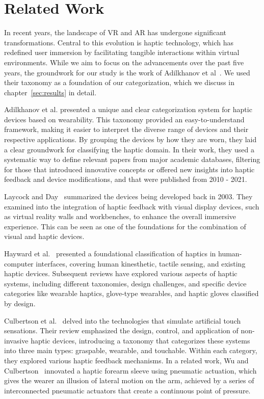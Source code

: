 \section{Related Work}
\label{sec:rel_work}

In recent years, the landscape of VR and AR has undergone significant transformations. Central to this evolution is haptic technology, which has redefined user immersion by facilitating tangible interactions within virtual environments. While we aim to focus on the advancements over the past five years, the groundwork for our study is the work of Adilkhanov et al~\cite{Adilkhanov22}. We used their taxonomy as a foundation of our categorization, which we discuss in chapter~\ref{sec:results} in detail.

Adilkhanov et al. presented a unique and clear categorization system for haptic devices based on wearability. This taxonomy provided an easy-to-understand framework, making it easier to interpret the diverse range of devices and their respective applications. By grouping the devices by how they are worn, they laid a clear groundwork for classifying the haptic domain. In their work, they used a systematic way to define relevant papers from major academic databases, filtering for those that introduced innovative concepts or offered new insights into haptic feedback and device modifications, and that were published from 2010 - 2021. 

Laycock and Day~\cite{Laycock03} summarized the devices being developed back in 2003. They examined into the integration of haptic feedback with visual display devices, such as virtual reality walls and workbenches, to enhance the overall immersive experience. This can be seen as one of the foundations for the combination of visual and haptic devices.

Hayward et al.~\cite{Hayward04c} presented a foundational classification of haptics in human-computer interfaces, covering human kinesthetic, tactile sensing, and existing haptic devices. Subsequent reviews have explored various aspects of haptic systems, including different taxonomies, design challenges, and specific device categories like wearable haptics, glove-type wearables, and haptic gloves classified by design.

Culbertson et al.~\cite{Culbertson18} delved into the technologies that simulate artificial touch sensations. Their review emphasized the design, control, and application of non-invasive haptic devices, introducing a taxonomy that categorizes these systems into three main types: graspable, wearable, and touchable. Within each category, they explored various haptic feedback mechanisms. In a related work, Wu and Culbertson~\cite{WuC19} innovated a haptic forearm sleeve using pneumatic actuation, which gives the wearer an illusion of lateral motion on the arm, achieved by a series of interconnected pneumatic actuators that create a continuous point of pressure.

